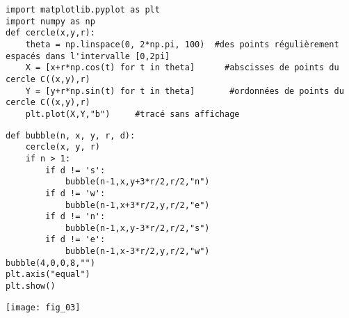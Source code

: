 \begin{lstlisting}
import matplotlib.pyplot as plt
import numpy as np
def cercle(x,y,r):
    theta = np.linspace(0, 2*np.pi, 100)  #des points régulièrement espacés dans l'intervalle [0,2pi]
    X = [x+r*np.cos(t) for t in theta]      #abscisses de points du cercle C((x,y),r)
    Y = [y+r*np.sin(t) for t in theta]       #ordonnées de points du cercle C((x,y),r)
    plt.plot(X,Y,"b")     #tracé sans affichage
\end{lstlisting}

\noindent\begin{minipage}[c]{.49\linewidth}
\begin{lstlisting}
def bubble(n, x, y, r, d):
    cercle(x, y, r)
    if n > 1:
        if d != 's':
            bubble(n-1,x,y+3*r/2,r/2,"n")
        if d != 'w':
            bubble(n-1,x+3*r/2,y,r/2,"e")
        if d != 'n':
            bubble(n-1,x,y-3*r/2,r/2,"s")
        if d != 'e':
            bubble(n-1,x-3*r/2,y,r/2,"w")
bubble(4,0,0,8,"")
plt.axis("equal")
plt.show()
\end{lstlisting}
\end{minipage} \hfill
\begin{minipage}[c]{.49\linewidth}
\begin{center}
\texttt{[image: fig\_03]}
\end{center}
\end{minipage}
%
%



